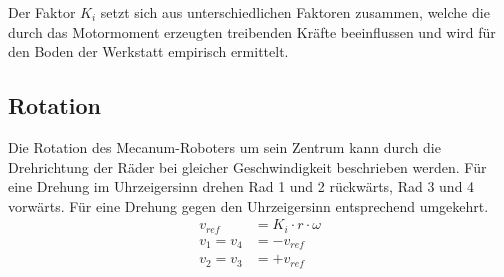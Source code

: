 \documentclass[a4paper]{article}
\begin{document}
Der Faktor $K_i$ setzt sich aus unterschiedlichen Faktoren zusammen, welche die durch das Motormoment erzeugten treibenden Kräfte beeinflussen und wird für den Boden der Werkstatt empirisch ermittelt.


\subsection{Rotation}
Die Rotation des Mecanum-Roboters um sein Zentrum kann durch die Drehrichtung der Räder bei gleicher Geschwindigkeit beschrieben werden.
Für eine Drehung im Uhrzeigersinn drehen Rad 1 und 2 rückwärts, Rad 3 und 4 vorwärts. Für eine Drehung gegen den Uhrzeigersinn entsprechend umgekehrt.
\begin{align*}
    v_{ref} &= K_i \cdot r \cdot \omega \\
    v_1 = v_4 &= - v_{ref}              \\
    v_2 = v_3 &= + v_{ref}
\end{align*}
\end{document}
